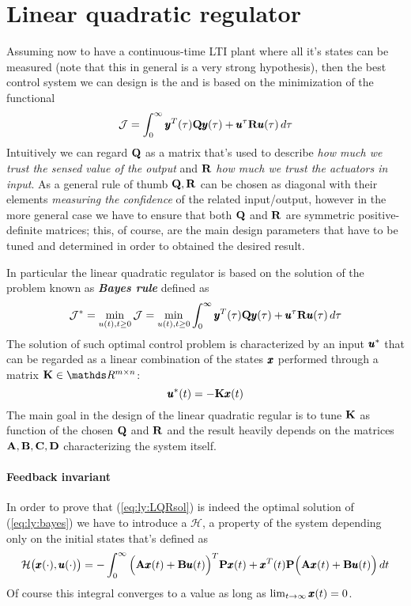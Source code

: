 \section{Linear quadratic regulator} \label{sec:LQR}
	Assuming now to have a continuous-time LTI plant where all it's states can be measured (note that this in general is a very strong hypothesis), then the best control system we can design is the  and is based on the minimization of the functional
	\begin{equation} \label{eq:ly:temp2}
		\mathcal J = \int_0^\infty \pmb{y}^T(\tau)\mathbf{Q} \pmb{y}(\tau) + \pmb{u}^\tau\mathbf{R} \pmb{u}(\tau)\, d\tau
	\end{equation}
	Intuitively we can regard $\mathbf{Q}$ as a matrix that's used to describe \textit{how much we trust the sensed value of the output} and $\mathbf{R}$ \textit{how much we trust the actuators in input}. As a general rule of thumb $\mathbf{Q},\mathbf{R}$ can be chosen as diagonal with their elements \textit{measuring the confidence} of the related input/output, however in the more general case we have to ensure that both $\mathbf{Q}$ and $\mathbf{R}$ are symmetric positive-definite matrices; this, of course, are the main design parameters that have to be tuned and determined in order to obtained the desired result.
	
	In particular the linear quadratic regulator is based on the solution of the problem known as \textbf{\textit{Bayes rule}} defined as
	\begin{equation} \label{eq:ly:bayes}
		\mathcal J^* = \min_{u(t), t\geq 0} \mathcal J = \min_{u(t), t\geq 0} \int_0^\infty \pmb{y}^T(\tau)\mathbf{Q} \pmb{y}(\tau) + \pmb{u}^\tau\mathbf{R} \pmb{u}(\tau)\, d\tau
	\end{equation}
	The solution of such optimal control problem is characterized by an input $\pmb{u}^*$ that can be regarded as a linear combination of the states $\pmb{x}$ performed through a matrix $\K \in \mathds R^{m\times n}$:
	\begin{equation} \label{eq:ly:LQRsol}
		\pmb{u}^*(t) = -\mathbf{K} \pmb{x}(t)
	\end{equation}
	The main goal in the design of the linear quadratic regular is to tune $\mathbf{K}$ as function of the chosen $\mathbf{Q}$ and $\mathbf{R}$ and the result heavily depends on the matrices $\mathbf{A},\mathbf{B},\mathbf{C},\mathbf{D}$ characterizing the system itself.
	
	\paragraph{Feedback invariant} In order to prove that (\ref{eq:ly:LQRsol}) is indeed the optimal solution of (\ref{eq:ly:bayes}) we have to introduce a  $\mathcal H$, a property of the system depending only on the initial states that's defined as
	\begin{equation} \label{eq:ly:invariant}
		\mathcal H\big(\pmb{x}(\cdot), \pmb{u}(\cdot)\big) = -\int_0^\infty\Big( \mathbf{A} \pmb{x}(t) + \mathbf{B} \pmb{u}(t) \Big)^T \mathbf{P} \pmb{x}(t) +  \pmb{x}^T(t)\mathbf{P} \Big(\mathbf{A} \pmb{x}(t) + \mathbf{B} \pmb{u}(t)\Big)\, dt
	\end{equation}
	Of course this integral converges to a value as long as $\lim_{t\rightarrow\infty} \pmb{x}(t) = 0$.
	
